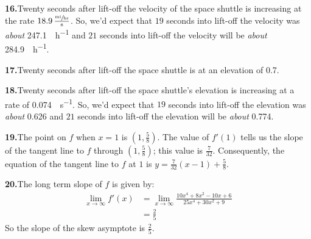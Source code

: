 \documentclass[10pt,oneside,]{book}
\theoremstyle{plain}
\theoremstyle{definition}
\numberwithin{equation}{section}
\newcommand{\fe}[2]{#1\mathopen{}\left(#2\right)\mathclose{}}
\newcommand{\point}[2]{\left(#1,#2\right)}
\newcommand{\fd}[1]{#1'}
\begin{document}
\par\smallskip
\noindent\textbf{16.}\quad{}Twenty seconds after lift-off the velocity of the space shuttle is increasing at the rate \(18.9\,\frac{\sfrac{\text{mi}}{\text{hr}}}{\text{s}}\).  So, we'd expect that \(19\) seconds into lift-off the velocity was \emph{about} \SI{247.1}{\mile\per\hour} and \(21\) seconds into lift-off the velocity will be \emph{about} \SI{284.9}{\mile\per\hour}.%
\par\smallskip
\noindent\textbf{17.}\quad{}Twenty seconds after lift-off the space shuttle is at an elevation of \SI{0.7}{\mile}.%
\par\smallskip
\noindent\textbf{18.}\quad{}Twenty seconds after lift-off the space shuttle's elevation is increasing at a rate of \SI{0.074}{\mile\per\second}.  So, we'd expect that \(19\) seconds into lift-off the elevation was \emph{about} \SI{0.626}{\mile} and \(21\) seconds into lift-off the elevation will be \emph{about} \SI{0.774}{\mile}.%
\par\smallskip
\noindent\textbf{19.}\quad{}The point on \(f\) when \(x=1\) is \(\point{1}{\frac{5}{8}}\).  The value of \(\fe{\fd{f}}{1}\) tells us the slope of the tangent line to \(f\) through \(\point{1}{\frac{5}{8}}\); this value is \(\frac{7}{32}\).  Consequently, the equation of the tangent line to \(f\) at \(1\) is \(y=\frac{7}{32}\left(x-1\right)+\frac{5}{8}\).%
\par\smallskip
\noindent\textbf{20.}\quad{}The long term slope of \(f\) is given by:\begin{align*}
\lim_{x\to\infty}\fe{\fd{f}}{x}&=\lim_{x\to\infty}\frac{10x^4+8x^2-10x+6}{25x^4+30x^2+9}\\
&=\frac{2}{5}
\end{align*}So the slope of the skew asymptote is \(\frac{2}{5}\).%
\par\smallskip
\end{document}
